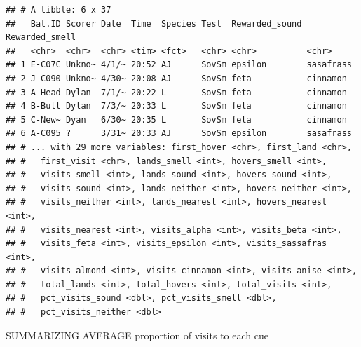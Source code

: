 \documentclass[]{article}
\newenvironment{Shaded}{\begin{snugshade}}{\end{snugshade}}
\newcommand{\KeywordTok}[1]{\textcolor[rgb]{0.13,0.29,0.53}{\textbf{{#1}}}}
\newcommand{\StringTok}[1]{\textcolor[rgb]{0.31,0.60,0.02}{{#1}}}
\newcommand{\CommentTok}[1]{\textcolor[rgb]{0.56,0.35,0.01}{\textit{{#1}}}}
\newcommand{\NormalTok}[1]{{#1}}
\begin{document}
\begin{Shaded}
\end{Shaded}

\begin{verbatim}
## # A tibble: 6 x 37
##   Bat.ID Scorer Date  Time  Species Test  Rewarded_sound Rewarded_smell
##   <chr>  <chr>  <chr> <tim> <fct>   <chr> <chr>          <chr>         
## 1 E-C07C Unkno~ 4/1/~ 20:52 AJ      SovSm epsilon        sasafrass     
## 2 J-C090 Unkno~ 4/30~ 20:08 AJ      SovSm feta           cinnamon      
## 3 A-Head Dylan  7/1/~ 20:22 L       SovSm feta           cinnamon      
## 4 B-Butt Dylan  7/3/~ 20:33 L       SovSm feta           cinnamon      
## 5 C-New~ Dyan   6/30~ 20:35 L       SovSm feta           cinnamon      
## 6 A-C095 ?      3/31~ 20:33 AJ      SovSm epsilon        sasafrass     
## # ... with 29 more variables: first_hover <chr>, first_land <chr>,
## #   first_visit <chr>, lands_smell <int>, hovers_smell <int>,
## #   visits_smell <int>, lands_sound <int>, hovers_sound <int>,
## #   visits_sound <int>, lands_neither <int>, hovers_neither <int>,
## #   visits_neither <int>, lands_nearest <int>, hovers_nearest <int>,
## #   visits_nearest <int>, visits_alpha <int>, visits_beta <int>,
## #   visits_feta <int>, visits_epsilon <int>, visits_sassafras <int>,
## #   visits_almond <int>, visits_cinnamon <int>, visits_anise <int>,
## #   total_lands <int>, total_hovers <int>, total_visits <int>,
## #   pct_visits_sound <dbl>, pct_visits_smell <dbl>,
## #   pct_visits_neither <dbl>
\end{verbatim}

\begin{Shaded}
\end{Shaded}

SUMMARIZING AVERAGE proportion of visits to each cue
\end{document}
